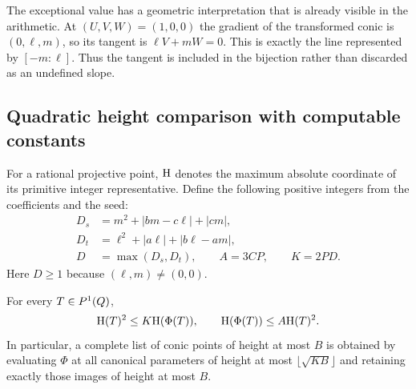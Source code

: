 The exceptional value has a geometric interpretation that is already
visible in the arithmetic.  At $(U,V,W)=(1,0,0)$ the gradient of the
transformed conic is $(0,\ell,m)$, so its tangent is
$\ell V+mW=0$.  This is exactly the line represented by $[-m:\ell]$.
Thus the tangent is included in the bijection rather than discarded as
an undefined slope.

\subsection{Quadratic height comparison with computable constants}

For a rational projective point, $\mathrm H$ denotes the maximum absolute
coordinate of its primitive integer representative.  Define the
following positive integers from the coefficients and the seed:
\begin{equation}\label{eq:conic-height-constants}
\begin{split}
 D_s&=m^2+|bm-c\ell|+|cm|,\\
 D_t&=\ell^2+|a\ell|+|b\ell-am|,\\
 D&=\max(D_s,D_t),\qquad A=3CP,\qquad K=2PD.
\end{split}
\end{equation}
Here $D\geq1$ because $(\ell,m)\ne(0,0)$.

\begin{theorem}
\label{thm:conic-height}
For every $T\in P^1(Q)$,
\begin{equation}\label{eq:conic-height}
 \mathrm H(T)^2\leq K\mathrm H(\Phi(T)),
 \qquad
 \mathrm H(\Phi(T))\leq A\mathrm H(T)^2.
\end{equation}
In particular, a complete list of conic points of height at most $B$
is obtained by evaluating $\Phi$ at all canonical parameters of height
at most $\lfloor\sqrt{KB}\rfloor$ and retaining exactly those images
of height at most $B$.
\end{theorem}

